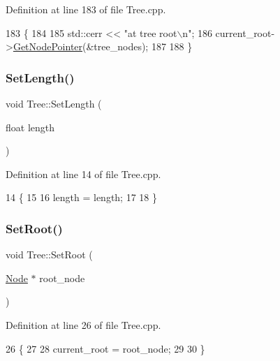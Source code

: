 Definition at line 183 of file Tree.\+cpp.


\begin{DoxyCode}
183                             \{
184    
185   std::cerr << \textcolor{stringliteral}{"at tree root\(\backslash\)n"};
186   current\_root->\hyperlink{classNode_a8e58dc16fc38e2076c7ddbe5b9f04177}{GetNodePointer}(&tree\_nodes);
187   
188 \}
\end{DoxyCode}
\mbox{\label{classTree_aa16a8485326ce51d6d7324f23066eb27}} 
\subsubsection{\texorpdfstring{Set\+Length()}{SetLength()}}
{\footnotesize\ttfamily void Tree\+::\+Set\+Length (\begin{DoxyParamCaption}\item[{float}]{length }\end{DoxyParamCaption})}



Definition at line 14 of file Tree.\+cpp.


\begin{DoxyCode}
14                                 \{
15 
16     length = length;
17   
18 \}
\end{DoxyCode}
\mbox{\label{classTree_ae592faa2c1f2da3cc1157bd9a4b884b5}} 
\subsubsection{\texorpdfstring{Set\+Root()}{SetRoot()}}
{\footnotesize\ttfamily void Tree\+::\+Set\+Root (\begin{DoxyParamCaption}\item[{\hyperlink{classNode}{Node} $\ast$}]{root\+\_\+node }\end{DoxyParamCaption})}



Definition at line 26 of file Tree.\+cpp.


\begin{DoxyCode}
26                                  \{
27   
28   current\_root = root\_node;
29   
30 \}
\end{DoxyCode}
\mbox{\label{classTree_a429c0d87d451e9b219e4d001923c7134}} 
